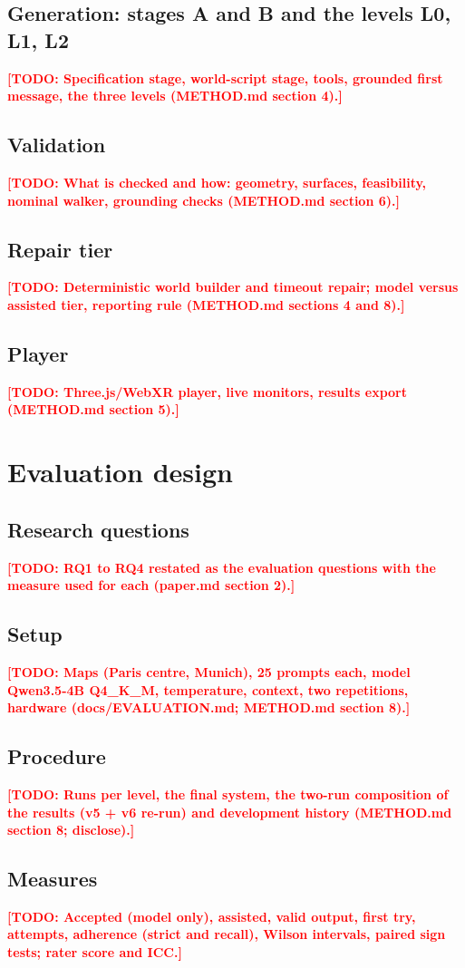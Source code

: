 \documentclass[preprint,12pt]{elsarticle}
\newcommand{\todo}[1]{\textcolor{red}{\textbf{[TODO: #1]}}}
\begin{document}
\subsection{Generation: stages A and B and the levels L0, L1, L2}
\todo{Specification stage, world-script stage, tools, grounded first message, the three levels (METHOD.md section 4).}
\subsection{Validation}
\todo{What is checked and how: geometry, surfaces, feasibility, nominal walker, grounding checks (METHOD.md section 6).}
\subsection{Repair tier}
\todo{Deterministic world builder and timeout repair; model versus assisted tier, reporting rule (METHOD.md sections 4 and 8).}
\subsection{Player}
\todo{Three.js/WebXR player, live monitors, results export (METHOD.md section 5).}

\section{Evaluation design}
\subsection{Research questions}
\todo{RQ1 to RQ4 restated as the evaluation questions with the measure used for each (paper.md section 2).}
\subsection{Setup}
\todo{Maps (Paris centre, Munich), 25 prompts each, model Qwen3.5-4B Q4\_K\_M, temperature, context, two repetitions, hardware (docs/EVALUATION.md; METHOD.md section 8).}
\subsection{Procedure}
\todo{Runs per level, the final system, the two-run composition of the results (v5 + v6 re-run) and development history (METHOD.md section 8; disclose).}
\subsection{Measures}
\todo{Accepted (model only), assisted, valid output, first try, attempts, adherence (strict and recall), Wilson intervals, paired sign tests; rater score and ICC.}
\end{document}
